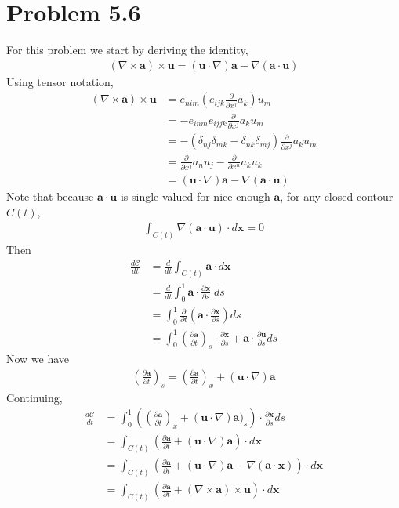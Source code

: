 \documentclass[12pt]{article}
\newcommand{\eq}[1]{\begin{align*}#1\end{align*}}
\newcommand{\p}[2]{\frac{\partial#1}{\partial#2}}
\newcommand{\de}[2]{\frac{d#1}{d#2}}
\begin{document}
\section*{Problem 5.6}
For this problem we start by deriving the identity,
\eq{
	(\nabla\times\bm{a})\times\bm{u} = (\bm{u}\cdot\nabla)\bm{a} - \nabla(\bm{a}\cdot\bm{u})
}
Using tensor notation,
\eq{
	(\nabla\times\bm{a})\times\bm{u} &= e_{nim}(e_{ijk}\p{}{x^j}a_k)u_m\\
	&= -e_{inm}e_{ijjk}\p{}{x^j}a_ku_m\\
	&= -(\delta_{nj}\delta_{mk} - \delta_{nk}\delta_{mj}) \p{}{x^j}a_ku_m\\
	&= \p{}{x^j}a_nu_j - \p{}{x^n}a_ku_k\\
	&= (\bm{u}\cdot\nabla)\bm{a} - \nabla(\bm{a}\cdot\bm{u})
}
Note that because $\bm{a}\cdot\bm{u}$ is single valued for nice enough $\bm{a}$, for any closed contour $C(t)$,
\eq{
	\int_{C(t)} \nabla(\bm{a}\cdot\bm{u})\cdot d\bm{x} = 0
}
Then
\eq{
	\de{\mathcal{C}}{t} &= \de{}{t} \int_{C(t)} \bm{a}\cdot d\bm{x}\\
	&= \de{}{t} \int_0^1 \bm{a}\cdot \p{\bm{x}}{s}\;ds\\
	&= \int_0^1 \p{}{t}\left(\bm{a}\cdot\p{\bm{x}}{s}\right)ds\\
	&= \int_0^1 \left(\p{\bm{a}}{t}\right)_s\cdot\p{\bm{x}}{s} + \bm{a}\cdot\p{\bm{u}}{s}ds
}
Now we have
\eq{
	\left(\p{\bm{a}}{t}\right)_s = \left(\p{\bm{a}}{t}\right)_x + (\bm{u}\cdot\nabla)\bm{a}
}
Continuing,
\eq{
	\de{\mathcal{C}}{t} &= \int_0^1 \left( \left(\p{\bm{a}}{t}\right)_x + (\bm{u}\cdot\nabla)\bm{a})_s\right)\cdot\p{\bm{x}}{s}ds\\
	&= \int_{C(t)} \left(\p{\bm{a}}{t} + (\bm{u}\cdot\nabla)\bm{a}\right)\cdot d\bm{x}\\
	&= \int_{C(t)} \left(\p{\bm{a}}{t} + (\bm{u}\cdot\nabla)\bm{a} - \nabla(\bm{a}\cdot\bm{x})\right)\cdot d\bm{x}\\
	&= \int_{C(t)} \left(\p{\bm{a}}{t} + (\nabla\times\bm{a})\times\bm{u}\right)\cdot d\bm{x}
}
\end{document}
